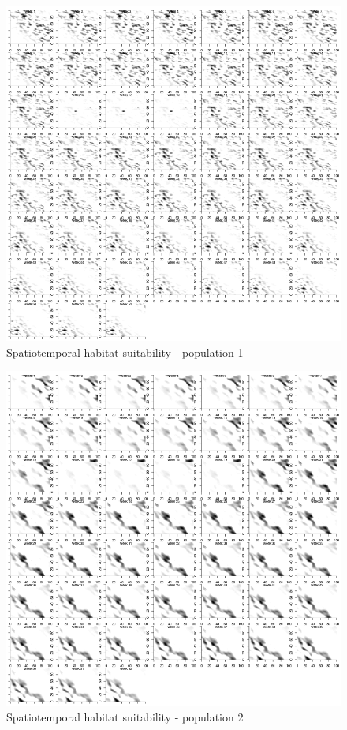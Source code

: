 \documentclass[review]{elsarticle}
\begin{document}
\begin{figure}[!ht]
	\includegraphics[width = \linewidth]{Plots/habitat_spatiotemp_spp_1}
	\caption{Spatiotemporal habitat suitability - population 1}
	\label{fig:5}
\end{figure}

\begin{figure}[!ht]
	\includegraphics[width = \linewidth]{Plots/habitat_spatiotemp_spp_2}
	\caption{Spatiotemporal habitat suitability - population 2}
	\label{fig:6}
\end{figure}
\end{document}
